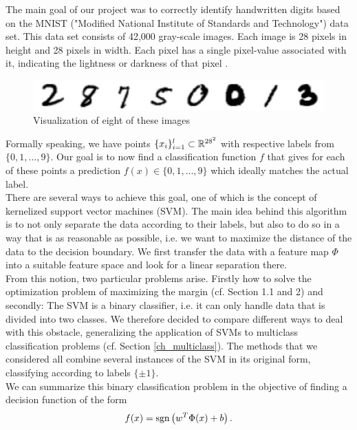 The main goal of our project was to correctly identify handwritten digits based on the MNIST  ("Modified National Institute of Standards and Technology") data set.
This data set consists of 42,000 gray-scale images. Each image is 28 pixels in height and 28 pixels in width. Each pixel has a single pixel-value associated with it, indicating the lightness or darkness of that pixel \cite{kaggel}.

\begin{figure}[h]
	\includegraphics[width=1\textwidth, center]{Digits2}
	\caption{Visualization of eight of these images}
\end{figure}


Formally speaking, we have points  $\{x_i\}_{i=1}^l \subset \mathbb{R}^{28^2}$ with respective labels from $\{0,1,\ldots, 9\}$. Our goal is to now find a classification function $f$ that gives for each of these points a prediction $f(x) \in \{0,1,\ldots, 9\}$ which ideally matches the actual label.\\

There are several ways to achieve this goal, one of which is the concept of {kernelized} support vector machines (SVM). The main idea behind this algorithm is to not only separate the data according to their labels, but also to do so in a way that is as reasonable as possible, i.e. we want to maximize the distance of the data to the decision boundary. We first transfer the data with a feature map $\Phi$ into a suitable feature space and look for a linear separation there.\\

From this notion, two particular problems arise. Firstly how to solve the optimization problem of maximizing the margin (cf. Section 1.1 and 2) and secondly: The SVM is a binary classifier, i.e. it can only handle data that is divided into two classes. We therefore decided to compare different ways to deal with this obstacle, generalizing the application of SVMs to multiclass  classification problems (cf. Section \ref{ch_multiclass}). The methods that we considered all combine several instances of the SVM in its original form, classifying according to labels $\{\pm 1\}$.\\

We can summarize this binary classification problem in the objective of finding a decision function of the form
\begin{equation*}
f(x) = \operatorname{sgn} \left(w^T\Phi(x) + b\right).
\end{equation*}


